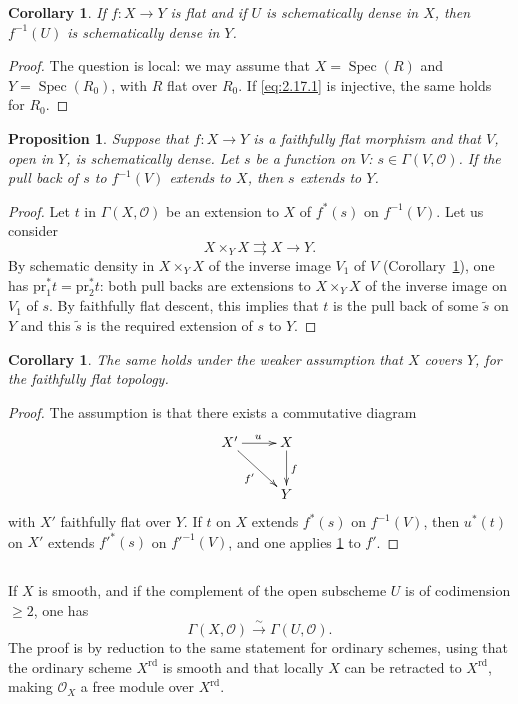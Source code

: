 \documentclass[11pt,a4paper]{article}
\theoremstyle{plain}
\newtheorem{proposition}[theorem]{Proposition}
\newtheorem{corollary}[theorem]{Corollary}
\theoremstyle{definition}
\DeclareMathOperator{\Spec}{Spec}
\newcommand{\simto}{\xrightarrow{\sim}}
\begin{document}
\begin{corollary}\label{cor:2.18}
If $f : X \to Y$ is flat and if $U$ is schematically dense in $X$, then $f^{-1}(U)$ is schematically dense in $Y$.
\end{corollary}

\begin{proof}
The question is local: we may assume that $X = \Spec(R)$ and $Y = \Spec(R_0)$, with $R$ flat over $R_0$. If \eqref{eq:2.17.1} is injective, the same holds for $R_0$.
\end{proof}

\begin{proposition}\label{prop:2.19}
Suppose that $f : X \to Y$ is a faithfully flat morphism and that $V$, open in $Y$, is schematically dense. Let $s$ be a function on $V$: $s \in \Gamma(V, \mathcal{O})$. If the pull back of $s$ to $f^{-1}(V)$ extends to $X$, then $s$ extends to $Y$.
\end{proposition}

\begin{proof}
Let $t$ in $\Gamma(X, \mathcal{O})$ be an extension to $X$ of $f^*(s)$ on $f^{-1}(V)$. Let us consider
\[
X \times_Y X \rightrightarrows X \to Y.
\]
By schematic density in $X \times_Y X$ of the inverse image $V_1$ of $V$ (Corollary~\ref{cor:2.18}), one has $\mathrm{pr}_1^* t = \mathrm{pr}_2^* t$: both pull backs are extensions to $X \times_Y X$ of the inverse image on $V_1$ of $s$. By faithfully flat descent, this implies that $t$ is the pull back of some $\tilde{s}$ on $Y$ and this $\tilde{s}$ is the required extension of $s$ to $Y$.
\end{proof}

\begin{corollary}\label{cor:2.20}
The same holds under the weaker assumption that $X$ covers $Y$, for the faithfully flat topology.
\end{corollary}

\begin{proof}
The assumption is that there exists a commutative diagram
\[
\xymatrix{
X' \ar[r]^{u} \ar[rd]_{f'} & X \ar[d]^{f} \\
& Y
}
\]
with $X'$ faithfully flat over $Y$. If $t$ on $X$ extends $f^*(s)$ on $f^{-1}(V)$, then $u^*(t)$ on $X'$ extends $f'^*(s)$ on $f'^{-1}(V)$, and one applies \ref{prop:2.19} to $f'$.
\end{proof}

\subsection{}
\label{sec:2.21}
If $X$ is smooth, and if the complement of the open subscheme $U$ is of codimension $\geq 2$, one has
\[
\Gamma(X, \mathcal{O}) \simto \Gamma(U, \mathcal{O}).
\]
The proof is by reduction to the same statement for ordinary schemes, using that the ordinary scheme $X^{\mathrm{rd}}$ is smooth and that locally $X$ can be retracted to $X^{\mathrm{rd}}$, making $\mathcal{O}_X$ a free module over $X^{\mathrm{rd}}$.
\end{document}

